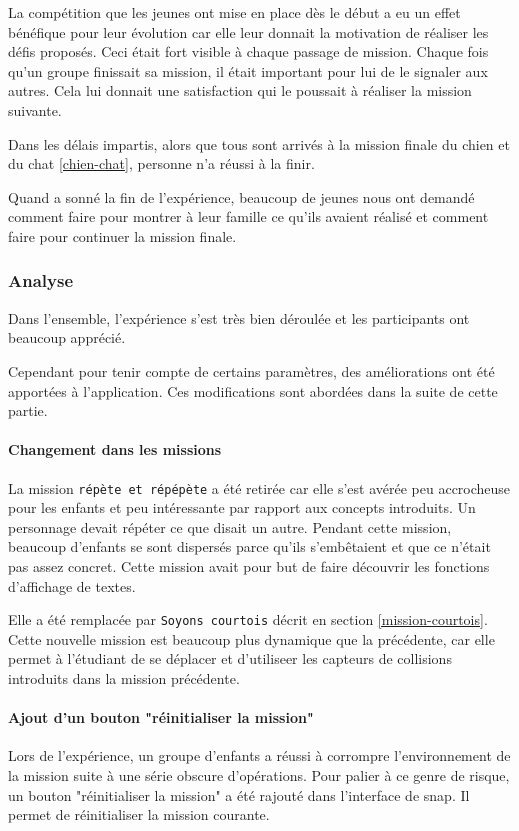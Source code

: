 La compétition que les jeunes ont mise en place dès le début a eu un effet bénéfique pour leur évolution car elle leur donnait la motivation de réaliser les défis proposés. Ceci était fort visible à chaque passage de mission. Chaque fois qu'un groupe finissait sa mission, il était important pour lui de le signaler aux autres. Cela lui donnait une satisfaction qui le poussait à réaliser la mission suivante.

Dans les délais impartis, alors que tous sont arrivés à la mission finale du chien et du chat \ref{chien-chat}, personne n'a réussi à la finir.

Quand a sonné la fin de l'expérience, beaucoup de jeunes nous ont demandé comment faire pour montrer à leur famille ce qu'ils avaient réalisé et comment faire pour continuer la mission finale.

\subsubsection{Analyse}
\label{analyse-kidscode}
Dans l'ensemble, l'expérience s'est très bien déroulée et les participants ont beaucoup apprécié.

Cependant pour tenir compte de certains paramètres, des améliorations ont été apportées à l'application. Ces modifications sont abordées dans la suite de cette partie.

\paragraph{Changement dans les missions}
La mission \texttt{répète et répépète} a été retirée car elle s'est avérée peu accrocheuse pour les enfants et peu intéressante par rapport aux concepts introduits. Un personnage devait répéter ce que disait un autre. Pendant cette mission, beaucoup d'enfants se sont dispersés parce qu'ils s'embêtaient et que ce n'était pas assez concret. Cette mission avait pour but de faire découvrir les fonctions d'affichage de textes.

Elle a été remplacée par \texttt{Soyons courtois} décrit en section \ref{mission-courtois}. Cette nouvelle mission est beaucoup plus dynamique que la précédente, car elle permet à l'étudiant de se déplacer et d'utiliseer les capteurs de collisions introduits dans la mission précédente.

\paragraph{Ajout d'un bouton "réinitialiser la mission"}
Lors de l'expérience, un groupe d'enfants a réussi à corrompre l'environnement de la mission suite à une série obscure d'opérations. Pour palier à ce genre de risque, un bouton "réinitialiser la mission" a été rajouté dans l'interface de \gls{snap}. Il permet de réinitialiser la mission courante.

